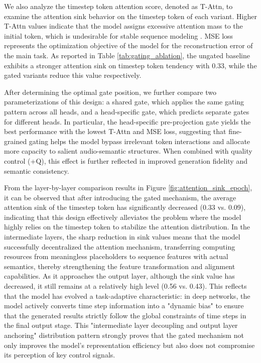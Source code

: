 \documentclass[lettersize,journal]{IEEEtran}
\begin{document}
We also analyze the timestep token attention score, denoted as T-Attn, to examine the attention sink behavior on the timestep token of each variant. Higher T-Attn values indicate that the model assigns excessive attention mass to the initial token, which is undesirable for stable sequence modeling \cite{xiao2023efficient}. MSE loss represents the optimization objective of the model for the reconstruction error of the main task. As reported in Table \ref{tab:gating_ablation}, the ungated baseline exhibits a stronger attention sink on timestep token tendency with 0.33, while the gated variants reduce this value respectively. 

After determining the optimal gate position, we further compare two parameterizations of this design: a shared gate, which applies the same gating pattern across all heads, and a head-specific gate, which predicts separate gates for different heads. In particular, the head-specific pre-projection gate yields the best performance with the lowest T-Attn and MSE loss, suggesting that fine-grained gating helps the model bypass irrelevant token interactions and allocate more capacity to salient audio-semantic structures. When combined with quality control (+Q), this effect is further reflected in improved generation fidelity and semantic consistency.

From the layer-by-layer comparison results in Figure \ref{fig:attention_sink_epoch}, it can be observed that after introducing the gated mechanism, the average attention sink of the timestep token has significantly decreased (0.33 vs. 0.09), indicating that this design effectively alleviates the problem where the model highly relies on the timestep token to stabilize the attention distribution. In the intermediate layers, the sharp reduction in sink values means that the model successfully decentralized the attention mechanism, transferring computing resources from meaningless placeholders to sequence features with actual semantics, thereby strengthening the feature transformation and alignment capabilities. As it approaches the output layer, although the sink value has decreased, it still remains at a relatively high level (0.56 vs. 0.43). This reflects that the model has evolved a task-adaptive characteristic: in deep networks, the model actively converts time step information into a "dynamic bias" to ensure that the generated results strictly follow the global constraints of time steps in the final output stage. This "intermediate layer decoupling and output layer anchoring" distribution pattern strongly proves that the gated mechanism not only improves the model's representation efficiency but also does not compromise its perception of key control signals.
\end{document}
